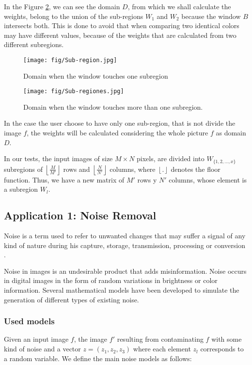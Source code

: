 In the Figure \ref{fig:Sub-regiones}, we can see the domain $D$, from which we shall calculate the weights, belong to the union of the sub-regions $W_1$ and $W_2$ because the window $B$ intersects both. This is done to avoid that when comparing two identical colors may have different values, because of the weights that are calculated from two different subregions.  

\begin{figure}
	\centering
		\texttt{[image: fig/Sub-region.jpg]}
	\caption{Domain when the window touches one subregion}
	\label{fig:Sub-region}
\end{figure}

\begin{figure}
	\centering
		\texttt{[image: fig/Sub-regiones.jpg]}
	\caption{Domain when the window touches more than one subregion.}
	\label{fig:Sub-regiones}
\end{figure}

In the case the user choose to have only one sub-region, that is not divide the image $f$, the weights will be calculated considering the whole picture $f$ as domain $D$.

In our tests, the input images of size $M \times N$ pixels, are divided into  $W_{\{1,2,...,x\}}$ subregions of $\left\lfloor\frac{M}{M'}\right\rfloor$ rows and $\left\lfloor\frac{N}{N'}\right\rfloor$ columns, where $\left\lfloor.\right\rfloor$ denotes the floor function. Thus, we have a new matrix of $M'$ rows y $N'$ columns, whose element is a subregion $W_l$.

\subsection{Application 1: Noise Removal}
Noise is a term used to refer to unwanted changes that may suffer a signal of any kind of nature during his capture, storage, transmission, processing or conversion \cite{tuzlukov2002signal}.

Noise in images is an undesirable product that adds misinformation. Noise occurs in digital images in the form of random variations in brightness or color information. 
Several mathematical models have been developed to simulate the generation of different types of existing noise. 

\subsubsection{Used models} 
Given an input image $f$, the image $f'$ resulting from contaminating $f$ with some kind of noise and a vector $z = (z_1, z_2, z_3)$ where each element $z_l$ corresponds to a random variable. We define the main noise models as follows:

